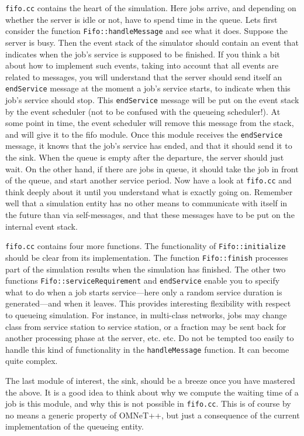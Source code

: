 \documentclass[a4paper]{article}
\begin{document}
\texttt{fifo.cc} contains the heart of the simulation. Here jobs
arrive, and depending on whether the server is idle or not, have to
spend time in the queue. Lets first consider the function
\texttt{Fifo::handleMessage} and see what it does. Suppose the server
is busy. Then the event stack of the simulator should contain an event
that indicates when the job's service is supposed to be finished.  If
you think a bit about how to implement such events, taking into
account that all events are related to messages, you will understand
that the server should send itself an \texttt{endService} message at
the moment a job's service starts, to indicate when this job's service
should stop.  This \texttt{endService} message will be put on the
event stack by the event scheduler (not to be confused with the
queueing scheduler!). At some point in time, the event scheduler will
remove this message from the stack, and will give it to
the fifo module.  Once this module receives the \texttt{endService}
message, it knows that the job's service has ended, and that it should
send it to the sink. When the queue is empty after the departure, the
server should just wait. On the other hand, if there are jobs in
queue, it should take the job in front of the queue, and start another
service period. Now have a look at \texttt{fifo.cc} and think deeply
about it until you understand what is exactly going on. Remember well
that a simulation entity has no other means to communicate with itself
in the future than via self-messages, and that these messages have to
be put on the internal event stack.

\texttt{fifo.cc} contains four more functions. The functionality of
\texttt{Fifo::initialize} should be clear from its implementation. The
function \texttt{Fifo::finish} processes part of the simulation
results when the simulation has finished.  The other two functions
\texttt{Fifo::serviceRequirement} and \texttt{endService} enable you
to specify what to do when a job starts service---here only a random
service duration is generated---and when it leaves. This provides
interesting flexibility with respect to queueing simulation. For
instance, in multi-class networks, jobs may change class from service
station to service station, or a fraction may be sent back for another
processing phase at the server, etc. etc. Do not be tempted too easily
to handle this kind of functionality in the \texttt{handleMessage}
function. It can become quite complex.

The last module  of interest, the sink, should be a breeze once
you have mastered the above. It is a good idea to think about why we
compute the waiting time of a job is this module, and why this is not
possible in \texttt{fifo.cc}. This is of course by no means a generic
property of OMNeT++, but just a consequence of the current
implementation of the queueing entity.
\end{document}

